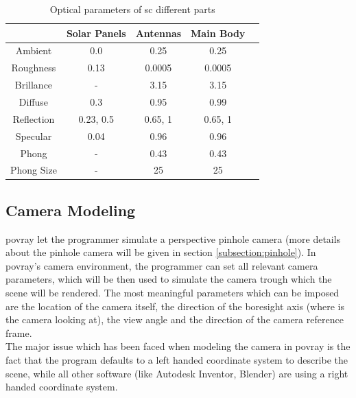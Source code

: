 \begin{table}[htbp]
  \centering
  \begin{tabular}{c cccc}
    \hline
    \hline
               & Solar Panels & Antennas  & Main Body \\
    \hline
    Ambient    & 0.0          & 0.25      & 0.25      \\
    Roughness  & 0.13         & 0.0005    & 0.0005    \\
    Brillance  & -            & 3.15      & 3.15      \\
    Diffuse    & 0.3          & 0.95      & 0.99      \\
    Reflection & {0.23, 0.5}  & {0.65, 1} & {0.65, 1} \\
    Specular   & 0.04         & 0.96      & 0.96      \\
    Phong      & -            & 0.43      & 0.43      \\
    Phong Size & -            & 25        & 25        \\
    \hline
    \hline
  \end{tabular}
  \caption{Optical parameters of \acrshort{sc} different parts}
  \label{tab:SCParameters}
\end{table}

\subsection{Camera Modeling}
\acrshort{povray} let the programmer simulate a perspective pinhole camera (more details about the pinhole camera will be given in section \ref{subsection:pinhole}). In \acrshort{povray}'s camera environment, the programmer can set all relevant camera parameters, which will be then used to simulate the camera trough which the scene will be rendered.
The most meaningful parameters which can be imposed are the location of the camera itself, the direction of the boresight axis (where is the camera looking at), the view angle and the direction of the camera reference frame.\\
The major issue which has been faced when modeling the camera in \acrshort{povray} is the fact that the program defaults to a left handed coordinate system to describe the scene, while all other software (like Autodesk Inventor, Blender) are using a right handed coordinate system.

